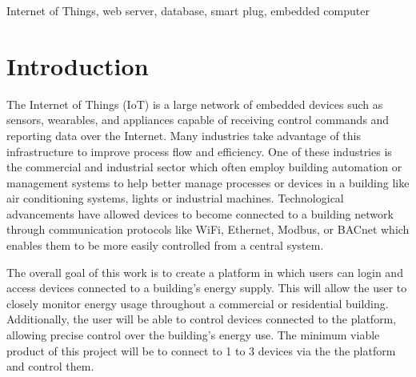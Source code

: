 \documentclass[conference]{IEEEtran}
\begin{document}
\begin{IEEEkeywords}
  Internet of Things, web server, database, smart plug, embedded computer
\end{IEEEkeywords}

\section{Introduction}
\label{sec:introduction}

The Internet of Things (IoT) is a large network of embedded devices such as sensors, wearables, and appliances capable of receiving control commands and reporting
data over the Internet. Many industries take advantage of this infrastructure to
improve process flow and efficiency. One of these industries is the commercial
and industrial sector which often employ building automation or management
systems to help better manage processes or devices in a building like air
conditioning systems, lights or industrial machines. Technological advancements
have allowed devices to become connected to a building network through
communication protocols like WiFi, Ethernet, Modbus, or BACnet which enables
them to be more easily controlled from a central system.


The overall goal of this work is to create a platform in which users can login and access devices
connected to a building's energy supply. This will allow the user to closely
monitor energy usage throughout a commercial or residential building.
Additionally, the user will be able to control devices connected to the
platform, allowing precise control over the building's energy use. The minimum
viable product of this project will be to connect to 1 to 3 devices via the the
platform and control them.

\end{document}
